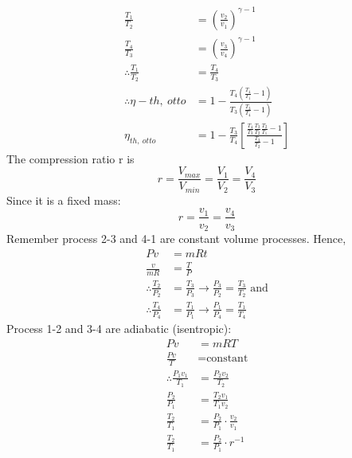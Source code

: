 \begin{align}
  \frac{T_1}{T_2}              & = \left( \frac{v_2}{v_1} \right)^{\gamma -1}                                                                       \\
  \frac{T_4}{T_3}              & = \left( \frac{v_3}{v_4} \right)^{\gamma -1}                                                                       \\
  \therefore \frac{T_1}{T_2}   & = \frac{T_4}{T_3}                                                                                                  \\
  \therefore \eta-{th, \ otto} & = 1 - \frac{T_4 \left( \frac{T_4}{T_1} -1 \right)}{T_3 \left( \frac{T_3}{T_4} - 1 \right)}                         \\
  \eta_{th, \ otto}            & = 1 - \frac{T_3}{T_4}\left[ \frac{\frac{T_4}{T_3} \frac{T_3}{T_2} \frac{T_2}{T_1} - 1}{\frac{T_3}{T_2} -1} \right]
\end{align}
The compression ratio r is
\begin{equation}
  r = \frac{V_{max}}{V_{min}} = \frac{V_1}{V_2} = \frac{V_4}{V_3}
\end{equation}
Since it is a fixed mass:
\begin{equation}
  r = \frac{v_1}{v_2} = \frac{v_4}{v_3}
\end{equation}
Remember process 2-3 and 4-1  are constant volume processes. Hence,
\begin{align}
  Pv                         & = mRt                                                                         \\
  \frac{v}{mR}               & = \frac{T}{P}                                                                 \\
  \therefore \frac{T_2}{P_2} & = \frac{T_3}{P_3} \rightarrow \frac{P_3}{P_2} = \frac{T_3}{T_2} \textrm{ and} \\
  \therefore \frac{T_4}{P_4} & = \frac{T_1}{P_1} \rightarrow \frac{P_1}{P_4} = \frac{T_1}{T_4}
\end{align}
Process 1-2 and 3-4 are adiabatic (isentropic):
\begin{align}
  Pv                             & = mRT                                   \\
  \frac{Pv}{T}                   & = \textrm{constant}                     \\
  \therefore \frac{P_1 v_1}{T_1} & = \frac{P_2 v_2}{T_2}                   \\
  \frac{P_2}{P_1}                & = \frac{T_2 v_1}{T_1 v_2}               \\
  \frac{T_2}{T_1}                & = \frac{P_2}{P_1} \cdot \frac{v_2}{v_1} \\
  \frac{T_2}{T_1}                & = \frac{P_2}{P_1} \cdot r^{-1}
\end{align}
